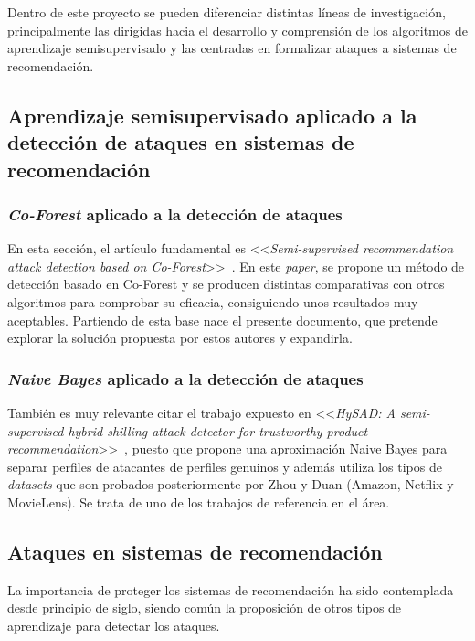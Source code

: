 
Dentro de este proyecto se pueden diferenciar distintas líneas de investigación, principalmente las dirigidas hacia el desarrollo y comprensión de los algoritmos de aprendizaje semisupervisado y las centradas en formalizar ataques a sistemas de recomendación.


\subsection{Aprendizaje semisupervisado aplicado a la detección de ataques en sistemas de recomendación}

\subsubsection{\textit{Co-Forest} aplicado a la detección de ataques~\cite{zhou2021SemisupervisedRecommendationAttack}}
En esta sección, el artículo fundamental es <<\textit{Semi-supervised recommendation attack detection based on Co-Forest}>>~\cite{zhou2021SemisupervisedRecommendationAttack}. En este \textit{paper}, se propone un método de detección basado en Co-Forest y se producen distintas comparativas con otros algoritmos para comprobar su eficacia, consiguiendo unos resultados muy aceptables. Partiendo de esta base nace el presente documento, que pretende explorar la solución propuesta por estos autores y expandirla.

\subsubsection{\textit{Naive Bayes} aplicado a la detección de ataques~\cite{zhiang2012HySADNayveBayes}}
También es muy relevante citar el trabajo expuesto en <<\textit{HySAD: A semi-supervised hybrid shilling attack detector for trustworthy product recommendation}>>~\cite{zhiang2012HySADNayveBayes}, puesto que propone una aproximación Naive Bayes para separar perfiles de atacantes de perfiles genuinos y además utiliza los tipos de \textit{datasets} que son probados posteriormente por Zhou y Duan (Amazon, Netflix y MovieLens). Se trata de uno de los trabajos de referencia en el área.

\subsection{Ataques en sistemas de recomendación}

La importancia de proteger los sistemas de recomendación ha sido contemplada desde principio de siglo, siendo común la proposición de otros tipos de aprendizaje para detectar los ataques.

